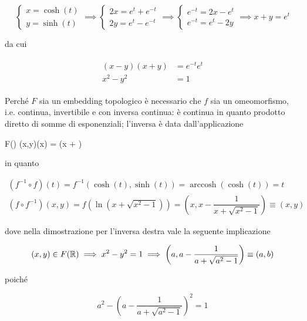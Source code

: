 {\begin{equation}
	\begin{cases}
		x = \cosh(t) \\
		y = \sinh(t)
	\end{cases} %
	\implies %
	\begin{cases}
		2 x = e^{t} + e^{-t} \\
		2 y = e^{t} - e^{-t}
	\end{cases} %
	\implies %
	\begin{cases}
		e^{-t} = 2 x - e^{t} \\
		e^{-t} = e^{t} - 2 y
	\end{cases} %
	\implies %
	x + y = e^{t}
\end{equation}

da cui

\begin{align}
	\begin{split}
		(x - y)(x + y) &= e^{-t} e^{t} \\
		x^{2} - y^{2} &= 1
	\end{split}
\end{align}

Perché $ F $ sia un embedding topologico è necessario che $ f $ sia un omeomorfismo, i.e. continua, invertibile e con inversa continua: è continua in quanto prodotto diretto di somme di esponenziali; l'inversa è data dall'applicazione

	{F(\R)}{\R}
	{(x,y)}{(x) = \ln(x + )}

in quanto

\begin{gather}
	(f^{-1} \circ f) (t) = f^{-1}(\cosh(t),\sinh(t)) = \operatorname{arccosh}(\cosh(t)) = t \\
	(f \circ f^{-1}) (x,y) = f \left( \ln(x + \sqrt{x^{2} - 1}) \right) = \left( x, x - \dfrac{1}{x + \sqrt{x^{2} - 1}} \right) \equiv (x,y)
\end{gather}

dove nella dimostrazione per l'inversa destra vale la seguente implicazione

\begin{equation}
	(x,y) \in F(\R) %
	\implies %
	x^{2} - y^{2} = 1 %
	\implies %
	\left( a, a - \dfrac{1}{a + \sqrt{a^{2} - 1}} \right) \equiv (a,b)
\end{equation}

poiché

\begin{equation}
	a^{2} - \left( a - \dfrac{1}{a + \sqrt{a^{2} - 1}} \right)^{2} = 1
\end{equation}

}

